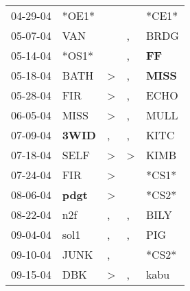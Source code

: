 \begin{supertabular}{p{0.07\textwidth}p{0.06\textwidth}p{0.02\textwidth}p{0.02\textwidth}p{0.06\textwidth}}
          04-29-04\textsuperscript{} &                            *OE1* &                  &                  &                            *CE1* \\
          05-07-04\textsuperscript{} &            VAN\textsuperscript{} &                  &                , &           BRDG\textsuperscript{} \\
          05-14-04\textsuperscript{} &                            *OS1* &                  &                , &    \textbf{FF\textsuperscript{}} \\
          05-18-04\textsuperscript{} &           BATH\textsuperscript{} &     \textgreater &                , &  \textbf{MISS\textsuperscript{}} \\
          05-28-04\textsuperscript{} &            FIR\textsuperscript{} &     \textgreater &                , &           ECHO\textsuperscript{} \\
          06-05-04\textsuperscript{} &           MISS\textsuperscript{} &     \textgreater &                , &           MULL\textsuperscript{} \\
          07-09-04\textsuperscript{} &  \textbf{3WID\textsuperscript{}} &                , &                , &           KITC\textsuperscript{} \\
          07-18-04\textsuperscript{} &           SELF\textsuperscript{} &     \textgreater &     \textgreater &           KIMB\textsuperscript{} \\
          07-24-04\textsuperscript{} &            FIR\textsuperscript{} &     \textgreater &                  &                            *CS1* \\
          08-06-04\textsuperscript{} &  \textbf{pdgt\textsuperscript{}} &     \textgreater &                  &                            *CS2* \\
          08-22-04\textsuperscript{} &            n2f\textsuperscript{} &                , &                , &           BILY\textsuperscript{} \\
          09-04-04\textsuperscript{} &           sol1\textsuperscript{} &                , &                , &            PIG\textsuperscript{} \\
          09-10-04\textsuperscript{} &           JUNK\textsuperscript{} &                , &                  &                            *CS2* \\
          09-15-04\textsuperscript{} &            DBK\textsuperscript{} &     \textgreater &                , &           kabu\textsuperscript{} \\

\end{supertabular}
